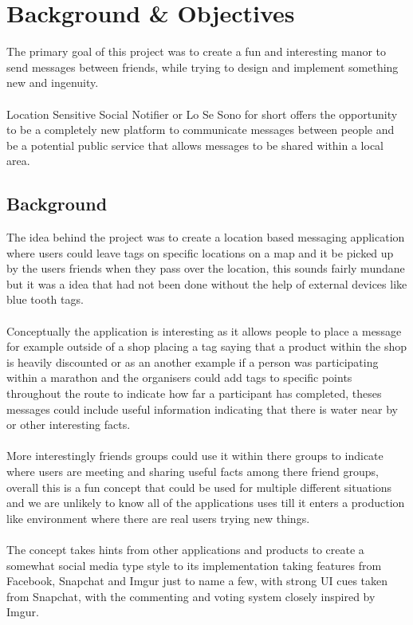 \chapter{Background \& Objectives}

The primary goal of this project was to create a fun and interesting manor to send messages between friends, while trying to design and implement something new and ingenuity.\\
\\
 Location Sensitive Social Notifier or Lo Se Sono for short offers the opportunity to be a completely new platform to communicate messages between people and be a potential public service that allows messages to be shared within a local area.

\section{Background}

The idea behind the project was to create a location based messaging application where users could leave tags on specific locations on a map and it be picked up by the users friends when they pass over the location, this sounds fairly mundane but it was a idea that had not been done without the help of external devices like blue tooth tags.\\
\\
Conceptually the application is interesting as it allows people to place a message for example outside of a shop placing a tag saying that a product within the shop is heavily discounted or as an another example if a person was participating within a marathon and the organisers could add tags to specific points throughout the route to indicate how far a participant has completed, theses messages could include useful information indicating that there is water near by or other interesting facts.\\
\\
More interestingly friends groups could use it within there groups to indicate where users are meeting and sharing useful facts among there friend groups, overall this is a fun concept that could be used for multiple different situations and we are unlikely to know all of the applications uses till it enters a production like environment where there are real users trying new things.\\
\\
The concept takes hints from other applications and products to create a somewhat social media type style to its implementation taking features from Facebook, Snapchat and Imgur just to name a few, with strong UI cues taken from Snapchat, with the commenting and voting system closely inspired by Imgur.

